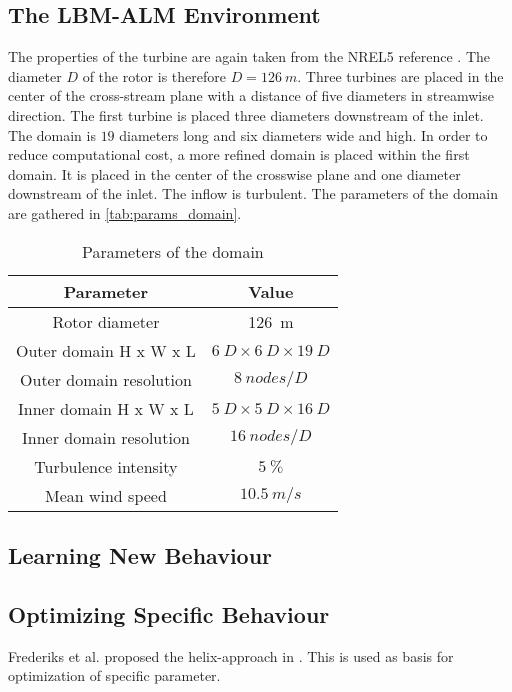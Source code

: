 \subsection{The LBM-ALM Environment}
\label{ssec:LBM_ALM_env}
The properties of the turbine are again taken from the NREL5 reference \cite{jonkman_definition_2009}. The diameter $D$ of the rotor is therefore $D=\SI{126}{m}$. Three turbines are placed in the center of the cross-stream plane with a distance of five diameters in streamwise direction. The first turbine is placed three diameters downstream of the inlet. The domain is $19$ diameters long and six diameters wide and high. In order to reduce computational cost, a more refined domain is placed within the first domain. It is placed in the center of the crosswise plane and one diameter downstream of the inlet. The inflow is turbulent. The parameters of the domain are gathered in \autoref{tab:params_domain}. \\ 
\begin{table}[h]
	\centering
	\caption{Parameters of the domain}
	\begin{tabular}{|c|c|}
	\hline
	Parameter & Value \\ \hline \hline
	Rotor diameter & \SI{126}{m} \\ \hline
	Outer domain H x W x L & $\SI{6}{D} \times \SI{6}{D} \times \SI{19}{D}$ \\ \hline
	Outer domain resolution & $\SI{8}{nodes/D}$ \\ \hline
	Inner domain H x W x L & $\SI{5}{D} \times \SI{5}{D} \times \SI{16}{D}$ \\ \hline
	Inner domain resolution & $\SI{16}{nodes/D}$ \\ \hline
	Turbulence intensity & $\SI{5}{\percent} $ \\ \hline
	Mean wind speed & $\SI{10.5}{m/s} $ \\ \hline
	\end{tabular}
	\label{tab:params_domain}
\end{table}
\subsection{Learning New Behaviour}
\subsection{Optimizing Specific Behaviour}
Frederiks et al. proposed the helix-approach in \cite{frederik_helix_2020}. This is used as basis for optimization of specific parameter.